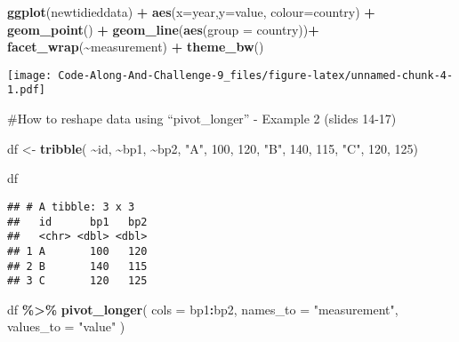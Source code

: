 \documentclass[
]{article}
\newenvironment{Shaded}{\begin{snugshade}}{\end{snugshade}}
\newcommand{\AttributeTok}[1]{\textcolor[rgb]{0.13,0.29,0.53}{#1}}
\newcommand{\DecValTok}[1]{\textcolor[rgb]{0.00,0.00,0.81}{#1}}
\newcommand{\FunctionTok}[1]{\textcolor[rgb]{0.13,0.29,0.53}{\textbf{#1}}}
\newcommand{\NormalTok}[1]{#1}
\newcommand{\OtherTok}[1]{\textcolor[rgb]{0.56,0.35,0.01}{#1}}
\newcommand{\SpecialCharTok}[1]{\textcolor[rgb]{0.81,0.36,0.00}{\textbf{#1}}}
\newcommand{\StringTok}[1]{\textcolor[rgb]{0.31,0.60,0.02}{#1}}
\begin{document}
\begin{Shaded}
\begin{Highlighting}[]
\FunctionTok{ggplot}\NormalTok{(newtidieddata) }\SpecialCharTok{+}
 \FunctionTok{aes}\NormalTok{(}\AttributeTok{x=}\NormalTok{year,}\AttributeTok{y=}\NormalTok{value, }\AttributeTok{colour=}\NormalTok{country) }\SpecialCharTok{+}
 \FunctionTok{geom\_point}\NormalTok{() }\SpecialCharTok{+}
 \FunctionTok{geom\_line}\NormalTok{(}\FunctionTok{aes}\NormalTok{(}\AttributeTok{group =}\NormalTok{ country))}\SpecialCharTok{+}
 \FunctionTok{facet\_wrap}\NormalTok{(}\SpecialCharTok{\textasciitilde{}}\NormalTok{measurement) }\SpecialCharTok{+}
 \FunctionTok{theme\_bw}\NormalTok{()}
\end{Highlighting}
\end{Shaded}

\texttt{[image: Code-Along-And-Challenge-9\_files/figure-latex/unnamed-chunk-4-1.pdf]}

\#How to reshape data using ``pivot\_longer'' - Example 2 (slides 14-17)

\begin{Shaded}
\begin{Highlighting}[]
\NormalTok{df }\OtherTok{\textless{}{-}} \FunctionTok{tribble}\NormalTok{(}
 \SpecialCharTok{\textasciitilde{}}\NormalTok{id, }\SpecialCharTok{\textasciitilde{}}\NormalTok{bp1, }\SpecialCharTok{\textasciitilde{}}\NormalTok{bp2,}
 \StringTok{"A"}\NormalTok{, }\DecValTok{100}\NormalTok{, }\DecValTok{120}\NormalTok{,}
 \StringTok{"B"}\NormalTok{, }\DecValTok{140}\NormalTok{, }\DecValTok{115}\NormalTok{,}
 \StringTok{"C"}\NormalTok{, }\DecValTok{120}\NormalTok{, }\DecValTok{125}\NormalTok{)}

\NormalTok{df}
\end{Highlighting}
\end{Shaded}

\begin{verbatim}
## # A tibble: 3 x 3
##   id      bp1   bp2
##   <chr> <dbl> <dbl>
## 1 A       100   120
## 2 B       140   115
## 3 C       120   125
\end{verbatim}

\begin{Shaded}
\begin{Highlighting}[]
\NormalTok{df }\SpecialCharTok{\%\textgreater{}\%}
 \FunctionTok{pivot\_longer}\NormalTok{(}
 \AttributeTok{cols =}\NormalTok{ bp1}\SpecialCharTok{:}\NormalTok{bp2,}
 \AttributeTok{names\_to =} \StringTok{"measurement"}\NormalTok{,}
 \AttributeTok{values\_to =} \StringTok{"value"}
\NormalTok{ )}
\end{Highlighting}
\end{Shaded}
\end{document}
